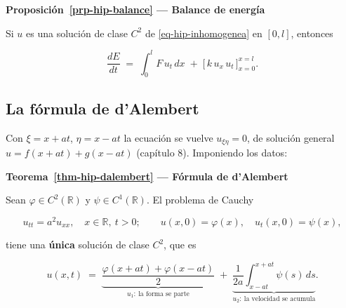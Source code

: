 \documentclass[
  spanish,
  a4paper,
]{scrbook}
\theoremstyle{definition}
\theoremstyle{plain}
\theoremstyle{definition}
\theoremstyle{plain}
\theoremstyle{definition}
\theoremstyle{remark}
\begin{document}
\begin{tcolorbox}[enhanced jigsaw, arc=.35mm, bottomrule=.15mm, breakable, colback=white, colframe=quarto-callout-note-color-frame, left=2mm, leftrule=.75mm, opacityback=0, rightrule=.15mm, toprule=.15mm]
\begin{minipage}[t]{5.5mm}
\textcolor{quarto-callout-note-color}{\faInfo}
\end{minipage}%
\begin{minipage}[t]{\textwidth - 5.5mm}

\vspace{-3mm}\textbf{Proposición~\ref{prp-hip-balance} --- Balance de energía}\vspace{3mm}

Si \(u\) es una solución de clase \(C^2\) de \ref{eq-hip-inhomogenea} en
\([0,l]\), entonces

\[
\frac{dE}{dt} \;=\; \int_0^l F\,u_t\,dx \;+\; \Big[\,k\,u_x\,u_t\,\Big]_{x=0}^{x=l} .
\]

\end{minipage}%
\end{tcolorbox}

\subsection{La fórmula de d'Alembert}\label{sec-hip-resumen-2}

Con \(\xi = x+at\), \(\eta = x-at\) la ecuación se vuelve
\(u_{\xi\eta} = 0\), de solución general \(u = f(x+at) + g(x-at)\)
(capítulo 8). Imponiendo los datos:

\begin{tcolorbox}[enhanced jigsaw, arc=.35mm, bottomrule=.15mm, breakable, colback=white, colframe=quarto-callout-note-color-frame, left=2mm, leftrule=.75mm, opacityback=0, rightrule=.15mm, toprule=.15mm]
\begin{minipage}[t]{5.5mm}
\textcolor{quarto-callout-note-color}{\faInfo}
\end{minipage}%
\begin{minipage}[t]{\textwidth - 5.5mm}

\vspace{-3mm}\textbf{Teorema~\ref{thm-hip-dalembert} --- Fórmula de d'Alembert}\vspace{3mm}

Sean \(\varphi\in C^2(\mathbb R)\) y \(\psi\in C^1(\mathbb R)\). El
problema de Cauchy

\[
u_{tt} = a^2u_{xx},\quad x\in\mathbb R,\ t>0;\qquad u(x,0) = \varphi(x),\quad u_t(x,0) = \psi(x),
\]

tiene una \textbf{única} solución de clase \(C^2\), que es

\[
u(x,t) \;=\; \underbrace{\frac{\varphi(x+at)+\varphi(x-at)}{2}}_{u_1:\ \text{la forma se parte}}
\;+\; \underbrace{\frac{1}{2a}\int_{x-at}^{x+at}\psi(s)\,ds}_{u_2:\ \text{la velocidad se acumula}} .
\]

\end{minipage}%
\end{tcolorbox}
\end{document}

